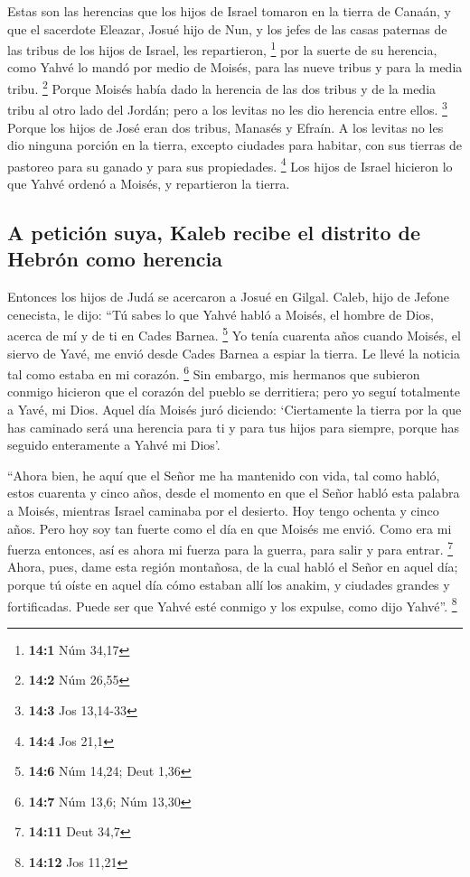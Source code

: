 \begin{paracol}{2}
 Estas son las herencias que los hijos de Israel tomaron
en la tierra de Canaán, y que el sacerdote Eleazar, Josué hijo de Nun, y
los jefes de las casas paternas de las tribus de los hijos de Israel,
les repartieron, \footnote{\textbf{14:1} Núm 34,17}  por
la suerte de su herencia, como Yahvé lo mandó por medio de Moisés, para
las nueve tribus y para la media tribu. \footnote{\textbf{14:2} Núm
  26,55}  Porque Moisés había dado la herencia de las dos
tribus y de la media tribu al otro lado del Jordán; pero a los levitas
no les dio herencia entre ellos. \footnote{\textbf{14:3} Jos 13,14-33}
 Porque los hijos de José eran dos tribus, Manasés y
Efraín. A los levitas no les dio ninguna porción en la tierra, excepto
ciudades para habitar, con sus tierras de pastoreo para su ganado y para
sus propiedades. \footnote{\textbf{14:4} Jos 21,1}  Los
hijos de Israel hicieron lo que Yahvé ordenó a Moisés, y repartieron la
tierra.

\hypertarget{a-peticiuxf3n-suya-kaleb-recibe-el-distrito-de-hebruxf3n-como-herencia}{%
\subsection{A petición suya, Kaleb recibe el distrito de Hebrón como
herencia}\label{a-peticiuxf3n-suya-kaleb-recibe-el-distrito-de-hebruxf3n-como-herencia}}

 Entonces los hijos de Judá se acercaron a Josué en
Gilgal. Caleb, hijo de Jefone cenecista, le dijo: ``Tú sabes lo que
Yahvé habló a Moisés, el hombre de Dios, acerca de mí y de ti en Cades
Barnea. \footnote{\textbf{14:6} Núm 14,24; Deut 1,36}  Yo
tenía cuarenta años cuando Moisés, el siervo de Yavé, me envió desde
Cades Barnea a espiar la tierra. Le llevé la noticia tal como estaba en
mi corazón. \footnote{\textbf{14:7} Núm 13,6; Núm 13,30} 
Sin embargo, mis hermanos que subieron conmigo hicieron que el corazón
del pueblo se derritiera; pero yo seguí totalmente a Yavé, mi Dios.
 Aquel día Moisés juró diciendo: `Ciertamente la tierra
por la que has caminado será una herencia para ti y para tus hijos para
siempre, porque has seguido enteramente a Yahvé mi Dios'.

 ``Ahora bien, he aquí que el Señor me ha mantenido con
vida, tal como habló, estos cuarenta y cinco años, desde el momento en
que el Señor habló esta palabra a Moisés, mientras Israel caminaba por
el desierto. Hoy tengo ochenta y cinco años.  Pero hoy
soy tan fuerte como el día en que Moisés me envió. Como era mi fuerza
entonces, así es ahora mi fuerza para la guerra, para salir y para
entrar. \footnote{\textbf{14:11} Deut 34,7}  Ahora, pues,
dame esta región montañosa, de la cual habló el Señor en aquel día;
porque tú oíste en aquel día cómo estaban allí los anakim, y ciudades
grandes y fortificadas. Puede ser que Yahvé esté conmigo y los expulse,
como dijo Yahvé''. \footnote{\textbf{14:12} Jos 11,21}


\end{paracol}
